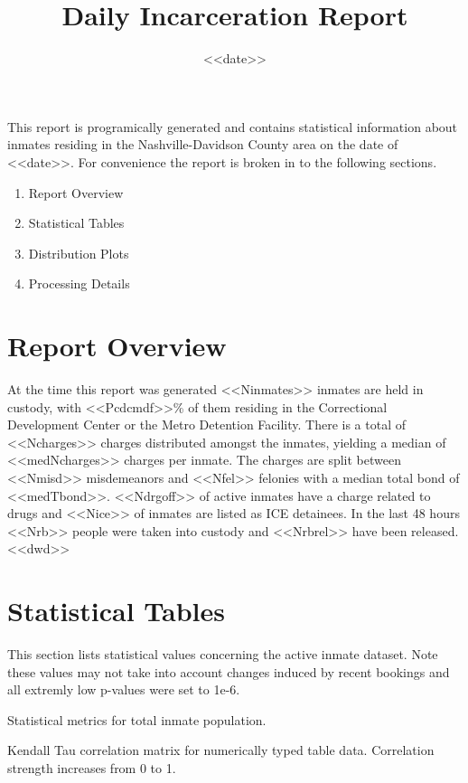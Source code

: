 \documentclass{article}
\title{Daily Incarceration Report}
\date{<<date>>}
\begin{document}
    
\maketitle
This report is programically generated and contains statistical information about inmates residing in the Nashville-Davidson County area on the date of <<date>>. For convenience the report is broken in to the following sections.
    
\begin{enumerate}
\item Report Overview
\item Statistical Tables
\item Distribution Plots
\item Processing Details
\end{enumerate}
    
\section{Report Overview}
 At the time this report was generated <<Ninmates>> inmates are held in custody, with <<Pcdcmdf>>\% of them residing in the Correctional Development Center or the Metro Detention Facility. There is a total of <<Ncharges>> charges distributed amongst the inmates, yielding a median of <<medNcharges>> charges per inmate. The charges are split between <<Nmisd>> misdemeanors and <<Nfel>> felonies with a median total bond of <<medTbond>>. <<Ndrgoff>> of active inmates have a charge related to drugs and <<Nice>> of inmates are listed as  ICE detainees. In the last 48 hours <<Nrb>> people were taken into custody and <<Nrbrel>> have been released. <<dwd>>

\section{Statistical Tables}
This section lists statistical values concerning the active inmate dataset. Note these values may not take into account changes induced by recent bookings and all extremly low p-values were set to 1e-6.

\begin{table}[H]
\centering
\noindent\makebox[\textwidth]{%
}
\caption{Statistical metrics for total inmate population.}
\label{Tab:metrics}
\end{table}

\begin{table}[H]
\centering
\noindent\makebox[\textwidth]{%
}
\caption{Kendall Tau correlation matrix for numerically typed table data. Correlation strength increases from 0 to 1.}
\label{Tab:kendall}
\end{table}
\end{document}
